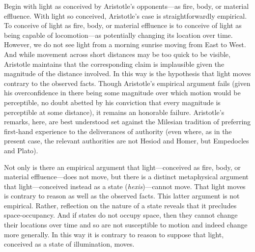 Begin with light as conceived by Aristotle's opponents---as fire, body, or material effluence. With light so conceived, Aristotle's case is straightforwardly empirical. To conceive of light as fire, body, or material effluence is to conceive of light as being capable of locomotion---as potentially changing its location over time. However, we do not see light from a morning sunrise moving from East to West. And while movement across short distances may be too quick to be visible, Aristotle maintains that the corresponding claim is implausible given the magnitude of the distance involved. In this way is the hypothesis that light moves contrary to the observed facts. Though Aristotle's empirical argument fails (given his overconfidence in there being some magnitude over which motion would be perceptible, no doubt abetted by his conviction that every magnitude is perceptible at some distance), it remains an honorable failure. Aristotle's remarks, here, are best understood set against the Milesian tradition of preferring first-hand experience to the deliverances of authority (even where, as in the present case, the relevant authorities are not Hesiod and Homer, but Empedocles and Plato).

Not only is there an empirical argument that light---conceived as fire, body, or material effluence---does not move, but there is a distinct metaphysical argument that light---\-con\-ceived instead as a state (\emph{hexis})---cannot move. That light moves is contrary to reason as well as the observed facts. This latter argument is not empirical. Rather, reflection on the nature of a state reveals that it precludes space-occupancy. And if states do not occupy space, then they cannot change their locations over time and so are not susceptible to motion and indeed change more generally.  In this way it is contrary to reason to suppose that light, conceived as a state of illumination, moves. 

